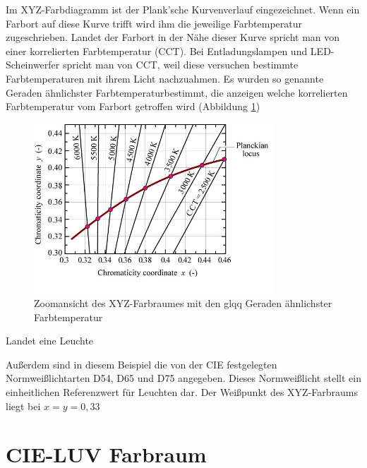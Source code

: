
Im XYZ-Farbdiagramm ist der Plank'sche Kurvenverlauf eingezeichnet. Wenn ein Farbort auf diese Kurve trifft wird ihm die jeweilige Farbtemperatur zugeschrieben. Landet der Farbort in der Nähe dieser Kurve spricht man von einer korrelierten Farbtemperatur (CCT). Bei Entladungslampen und LED-Scheinwerfer spricht man von CCT, weil diese versuchen bestimmte Farbtemperaturen mit ihrem Licht nachzuahmen. Es wurden so genannte \glqq Geraden ähnlichster Farbtemperatur\grqq bestimmt, die anzeigen welche korrelierten Farbtemperatur vom Farbort getroffen wird (Abbildung \ref{b_cct})    

\begin{figure}[H]     %
\centering
\includegraphics[width=0.8\textwidth]{bilder/cct} 
\caption {Zoomansicht des XYZ-Farbraumes mit den glqq Geraden ähnlichster Farbtemperatur\grqq \protect\footnotemark}\label{b_cct}
\end{figure}


Landet eine Leuchte 


 Außerdem sind in diesem Beispiel die von der CIE festgelegten Normweißlichtarten D54, D65 und D75 angegeben. Dieses Normweißlicht stellt ein einheitlichen Referenzwert für Leuchten dar. Der Weißpunkt des XYZ-Farbraums liegt bei $x=y=0,33$




\section{CIE-LUV Farbraum} \label{sec_luv}

